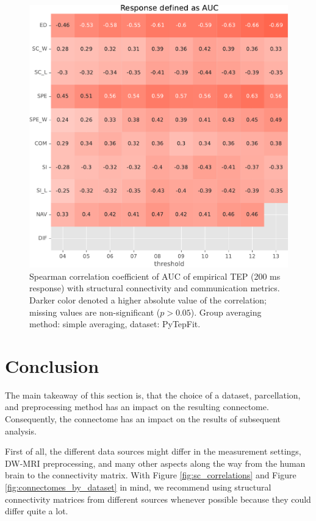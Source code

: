 \begin{figure}
    \centering
    \includegraphics[width=\textwidth]{images/nootebook_generated/pytepfit_results/empirical/200/not_over_threshold_nan/PyTepFit_simple/Response defined as AUC.pdf}
    \caption[TEPs AUC (200 ms) correlations (PyTepFit)]{Spearman correlation coefficient of AUC of empirical TEP (200 ms response) with structural connectivity and communication metrics. Darker color denoted a higher absolute value of the correlation; missing values are non-significant ($p>0.05$). Group averaging method: simple averaging, dataset: PyTepFit.}
    \label{fig:tms_auc_200_pytep_simple}
\end{figure}


\section{Conclusion}

The main takeaway of this section is, that the choice of a dataset, parcellation, and preprocessing method has an impact on the resulting connectome. Consequently, the connectome has an impact on the results of subsequent analysis.

First of all, the different data sources might differ in the measurement settings, DW-MRI preprocessing, and many other aspects along the way from the human brain to the connectivity matrix. With Figure \ref{fig:sc_correlations} and Figure \ref{fig:connectomes_by_dataset} in mind, we recommend using structural connectivity matrices from different sources whenever possible because they could differ quite a lot.

